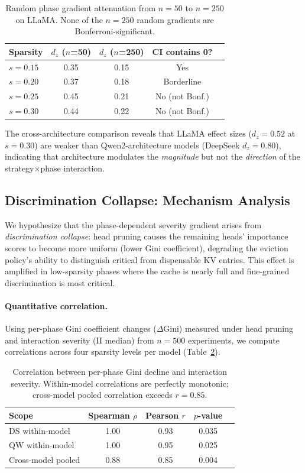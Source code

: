 \documentclass[11pt,a4paper]{article}
\begin{document}
\begin{table}[t]
\centering
\small
\caption{Random phase gradient attenuation from $n=50$ to $n=250$ on LLaMA. None of the $n=250$ random gradients are Bonferroni-significant.}
\label{tab:llama_random}
\begin{tabular}{lcccc}
\toprule
Sparsity & $d_z$ ($n$=50) & $d_z$ ($n$=250) & CI contains 0? \\
\midrule
$s=0.15$ & 0.35 & 0.15 & Yes \\
$s=0.20$ & 0.37 & 0.18 & Borderline \\
$s=0.25$ & 0.45 & 0.21 & No (not Bonf.) \\
$s=0.30$ & 0.44 & 0.22 & No (not Bonf.) \\
\bottomrule
\end{tabular}
\end{table}

The cross-architecture comparison reveals that LLaMA effect sizes ($d_z=0.52$ at $s=0.30$) are weaker than Qwen2-architecture models (DeepSeek $d_z=0.80$), indicating that architecture modulates the \emph{magnitude} but not the \emph{direction} of the strategy$\times$phase interaction.

\subsection{Discrimination Collapse: Mechanism Analysis}
\label{sec:mechanism}

We hypothesize that the phase-dependent severity gradient arises from \emph{discrimination collapse}: head pruning causes the remaining heads' importance scores to become more uniform (lower Gini coefficient), degrading the eviction policy's ability to distinguish critical from dispensable KV entries. This effect is amplified in low-sparsity phases where the cache is nearly full and fine-grained discrimination is most critical.

\paragraph{Quantitative correlation.} Using per-phase Gini coefficient changes ($\Delta$Gini) measured under head pruning and interaction severity (II median) from $n=500$ experiments, we compute correlations across four sparsity levels per model (Table~\ref{tab:gini_corr}).

\begin{table}[t]
\centering
\small
\caption{Correlation between per-phase Gini decline and interaction severity. Within-model correlations are perfectly monotonic; cross-model pooled correlation exceeds $r=0.85$.}
\label{tab:gini_corr}
\begin{tabular}{lcccc}
\toprule
Scope & Spearman $\rho$ & Pearson $r$ & $p$-value \\
\midrule
DS within-model & 1.00 & 0.93 & 0.035 \\
QW within-model & 1.00 & 0.95 & 0.025 \\
Cross-model pooled & 0.88 & 0.85 & 0.004 \\
\bottomrule
\end{tabular}
\end{table}
\end{document}
